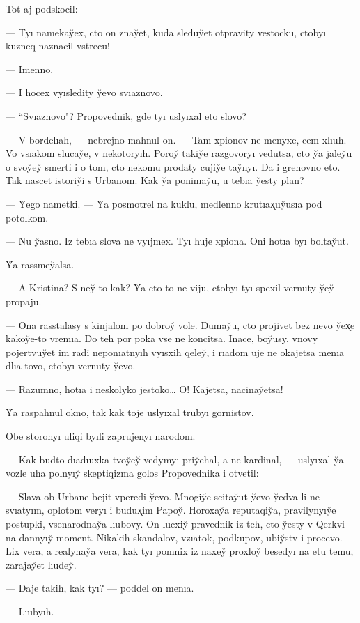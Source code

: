 \documentclass[10pt]{book}
\begin{document}
Tot aj podskocil:

— Tyı namekay̆ex, cto on znay̆et, kuda sleduy̆et otpravity vestocku, ctobyı kuzneq naznacil vstrecu!

— Imenno.

— I hocex vyısledity y̆evo svıaznovo.

— ``Svıaznovo"? Propovednik, gde tyı uslyıxal eto slovo?

— V bordelıah, — nebrejno mahnul on. — Tam xpionov ne menyxe, cem xlıuh. Vo vsıakom slucay̆e, v nekotoryıh. Poroy̆ takiy̆e razgovoryı vedutsa, cto y̆a jaley̆u o svoy̆ey̆ smerti i o tom, cto nekomu prodaty cujiy̆e tay̆nyı. Da i grehovno eto. Tak nascet istoriy̆i s Urbanom. Kak y̆a ponimay̆u, u tebıa y̆esty plan?

— Y̆ego nametki. — Y̆a posmotrel na kuklu, medlenno krutıax̨uy̆usıa pod potolkom.

— Nu y̆asno. Iz tebıa slova ne vyıjmex. Tyı huje xpiona. Oni hotıa byı boltay̆ut.

Y̆a rassmey̆alsa.

— A Kristina? S ney̆-to kak? Y̆a cto-to ne viju, ctobyı tyı spexil vernuty y̆ey̆ propaju.

— Ona rasstalasy s kinjalom po dobroy̆ vole. Dumay̆u, cto projivet bez nevo y̆ex̨e kakoy̆e-to vremıa. Do teh por poka vse ne koncitsa. Inace, boy̆usy, vnovy pojertvuy̆et im radi neponıatnyıh vyısxih qeley̆, i rıadom uje ne okajetsa menıa dlıa tovo, ctobyı vernuty y̆evo.

— Razumno, hotıa i neskolyko jestoko… O! Kajetsa, nacinay̆etsa!

Y̆a raspahnul okno, tak kak toje uslyıxal trubyı gornistov.

Obe storonyı uliqi byıli zaprujenyı narodom.

— Kak budto dıadıuxka tvoy̆ey̆ vedymyı priy̆ehal, a ne kardinal, — uslyıxal y̆a vozle uha polnyıy̆ skeptiqizma golos Propovednika i otvetil:

— Slava ob Urbane bejit vperedi y̆evo. Mnogiy̆e scitay̆ut y̆evo y̆edva li ne svıatyım, oplotom veryı i budux̨im Papoy̆. Horoxay̆a reputaqiy̆a, pravilynyıy̆e postupki, vsenarodnay̆a lıubovy. On lucxiy̆ pravednik iz teh, cto y̆esty v Qerkvi na dannyıy̆ moment. Nikakih skandalov, vzıatok, podkupov, ubiy̆stv i procevo. Lix vera, a realynay̆a vera, kak tyı pomnix iz naxey̆ proxloy̆ besedyı na etu temu, zarajay̆et lıudey̆.

— Daje takih, kak tyı? — poddel on menıa.

— Lıubyıh.
\end{document}
